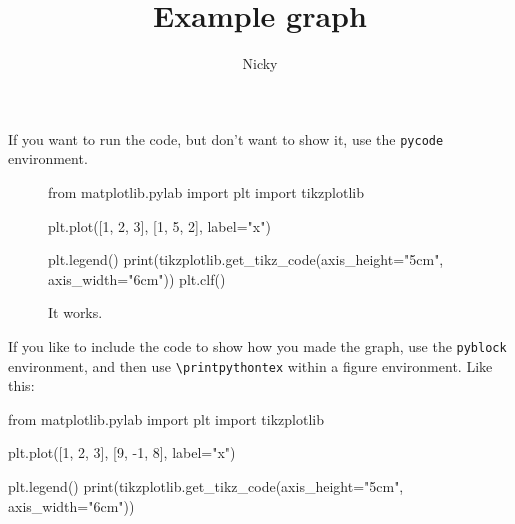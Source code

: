 \documentclass{article}
\title{Example graph}
\author{Nicky}
\begin{document}
\maketitle

If you want to run the code, but don't want to show it, use the \verb+pycode+ environment.

\begin{figure}[h]
\centering
\begin{pycode}

from matplotlib.pylab import plt
import tikzplotlib

plt.plot([1, 2, 3], [1, 5, 2], label="x")

plt.legend()
print(tikzplotlib.get_tikz_code(axis_height="5cm", axis_width="6cm"))
plt.clf()
\end{pycode}
\caption{It works.}
\end{figure}

If you like to include the code to show how you made the graph, use the \verb+pyblock+ environment, and then use \verb+\printpythontex+ within a figure environment. Like this: 

\begin{pyblock}

from matplotlib.pylab import plt
import tikzplotlib

plt.plot([1, 2, 3], [9, -1, 8], label="x")

plt.legend()
print(tikzplotlib.get_tikz_code(axis_height="5cm", axis_width="6cm"))
\end{pyblock}

\begin{figure}[h]
  \centering
  \printpythontex
\end{figure}
\end{document}
